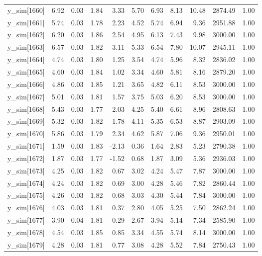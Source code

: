 \begin{table}[ht]
\begin{tabular}{rrrrrrrrrrr}
  y\_sim[1660] & 6.92 & 0.03 & 1.84 & 3.33 & 5.70 & 6.93 & 8.13 & 10.48 & 2874.49 & 1.00 \\ 
  y\_sim[1661] & 5.74 & 0.03 & 1.78 & 2.23 & 4.52 & 5.74 & 6.94 & 9.36 & 2951.88 & 1.00 \\ 
  y\_sim[1662] & 6.20 & 0.03 & 1.86 & 2.54 & 4.95 & 6.13 & 7.43 & 9.98 & 3000.00 & 1.00 \\ 
  y\_sim[1663] & 6.57 & 0.03 & 1.82 & 3.11 & 5.33 & 6.54 & 7.80 & 10.07 & 2945.11 & 1.00 \\ 
  y\_sim[1664] & 4.74 & 0.03 & 1.80 & 1.25 & 3.54 & 4.74 & 5.96 & 8.32 & 2836.02 & 1.00 \\ 
  y\_sim[1665] & 4.60 & 0.03 & 1.84 & 1.02 & 3.34 & 4.60 & 5.81 & 8.16 & 2879.20 & 1.00 \\ 
  y\_sim[1666] & 4.86 & 0.03 & 1.85 & 1.21 & 3.65 & 4.82 & 6.11 & 8.53 & 3000.00 & 1.00 \\ 
  y\_sim[1667] & 5.01 & 0.03 & 1.81 & 1.57 & 3.75 & 5.03 & 6.20 & 8.53 & 3000.00 & 1.00 \\ 
  y\_sim[1668] & 5.43 & 0.03 & 1.77 & 2.03 & 4.25 & 5.40 & 6.61 & 8.96 & 2808.63 & 1.00 \\ 
  y\_sim[1669] & 5.32 & 0.03 & 1.82 & 1.78 & 4.11 & 5.35 & 6.53 & 8.87 & 2903.09 & 1.00 \\ 
  y\_sim[1670] & 5.86 & 0.03 & 1.79 & 2.34 & 4.62 & 5.87 & 7.06 & 9.36 & 2950.01 & 1.00 \\ 
  y\_sim[1671] & 1.59 & 0.03 & 1.83 & -2.13 & 0.36 & 1.64 & 2.83 & 5.23 & 2790.38 & 1.00 \\ 
  y\_sim[1672] & 1.87 & 0.03 & 1.77 & -1.52 & 0.68 & 1.87 & 3.09 & 5.36 & 2936.03 & 1.00 \\ 
  y\_sim[1673] & 4.25 & 0.03 & 1.82 & 0.67 & 3.02 & 4.24 & 5.47 & 7.87 & 3000.00 & 1.00 \\ 
  y\_sim[1674] & 4.24 & 0.03 & 1.82 & 0.69 & 3.00 & 4.28 & 5.46 & 7.82 & 2860.44 & 1.00 \\ 
  y\_sim[1675] & 4.26 & 0.03 & 1.82 & 0.68 & 3.03 & 4.30 & 5.44 & 7.84 & 3000.00 & 1.00 \\ 
  y\_sim[1676] & 4.03 & 0.03 & 1.81 & 0.37 & 2.80 & 4.05 & 5.25 & 7.50 & 2862.24 & 1.00 \\ 
  y\_sim[1677] & 3.90 & 0.04 & 1.81 & 0.29 & 2.67 & 3.94 & 5.14 & 7.34 & 2585.90 & 1.00 \\ 
  y\_sim[1678] & 4.54 & 0.03 & 1.85 & 0.85 & 3.34 & 4.55 & 5.74 & 8.14 & 3000.00 & 1.00 \\ 
  y\_sim[1679] & 4.28 & 0.03 & 1.81 & 0.77 & 3.08 & 4.28 & 5.52 & 7.84 & 2750.43 & 1.00 \\ 

\end{tabular}
\end{table}
